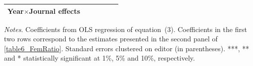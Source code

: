 \begin{table}
\begin{threeparttable}
\begin{tabular}{p{3cm}S@{}S@{}S@{}S@{}S@{}}
            Year\(\times\)Journal effects          &           {}   &           {}   &           {}   &           {}   &           {}   \\
            \bottomrule
        \end{tabular}
        \begin{tablenotes}
            \tiny
            \item \textit{Notes}. Coefficients from OLS regression of equation~(3). Coefficients in the first two rows correspond to the estimates presented in the second panel of \autoref{table6_FemRatio}. Standard errors clustered on editor (in parentheses). ***, ** and * statistically significant at 1\%, 5\% and 10\%, respectively.
        \end{tablenotes}
    \end{threeparttable}
\end{table}